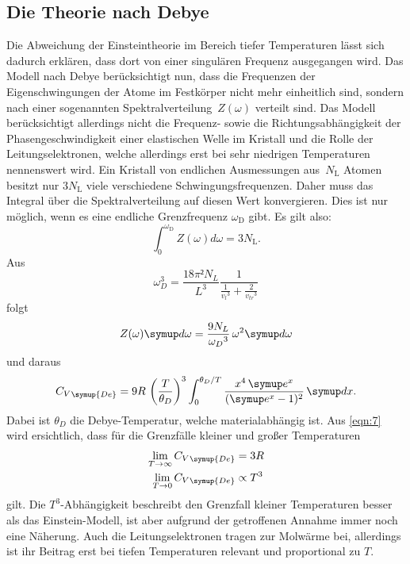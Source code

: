 \documentclass[
  bibliography=totoc,     %
  captions=tableheading,  %
  titlepage=firstiscover, %
]{scrartcl}
\begin{document}
\subsection{Die Theorie nach Debye}
Die Abweichung der Einsteintheorie im Bereich tiefer Temperaturen lässt sich
dadurch erklären, dass dort von einer singulären Frequenz ausgegangen wird.
Das Modell nach Debye berücksichtigt nun, dass die Frequenzen der
Eigenschwingungen der Atome im Festkörper nicht mehr einheitlich sind, sondern
nach einer sogenannten Spektralverteilung~$Z(\omega)$ verteilt sind.  Das Modell
berücksichtigt allerdings nicht die Frequenz- sowie die Richtungsabhängigkeit der
Phasengeschwindigkeit einer elastischen Welle im Kristall und die Rolle der
Leitungselektronen, welche allerdings erst bei sehr niedrigen Temperaturen
nennenswert wird. Ein Kristall von endlichen Ausmessungen aus~$N_{\mathrm{L}}$
Atomen besitzt nur $3N_{\mathrm{L}}$ viele verschiedene Schwingungsfrequenzen.
Daher muss das Integral über die
Spektralverteilung auf diesen Wert konvergieren. Dies ist nur möglich, wenn es
eine endliche Grenzfrequenz $\omega_{\mathrm{D}}$ gibt. Es gilt also:
%
\begin{equation}
  \int_0^{\omega_{\mathrm{D}}}Z(\omega)d\omega=3N_{\mathrm{L}}.
  \label{eq:konv}
\end{equation}
%
Aus
\begin{equation}
  \omega_D^3 = \frac{18 \pi² N_L}{L^3} \frac{1}{\frac{1}{{v_l}^3} + \frac{2}{{v_{tr}}^3}}
  \label{fürrune<3}
\end{equation}
folgt
\begin{equation*}
  Z(\omega) \symup d \omega = \frac{9N_L}{{\omega_D}^3} \, \omega^2 \symup d \omega
\end{equation*}
und daraus
\begin{equation}
  {C_V}_{\symup{De}} = 9 R \, \left(\frac{T}{\theta_D}\right)^3 \int_0^{\theta_D / T}
  \frac{x^4 \, \symup e^x}{(\symup e^x - 1)^2} \, \symup d x.
  \label{eqn:7}
\end{equation}
Dabei ist $\theta_D$ die Debye-Temperatur, welche materialabhängig ist. Aus \eqref{eqn:7}
wird ersichtlich, dass für die Grenzfälle kleiner und großer Temperaturen
\begin{align}
  \lim \limits_{T \to \infty}{{C_V}_{\symup{De}}} &= 3R \\
  \lim \limits_{T \to 0}{{C_V}_{\symup{De}}} &\propto T^3
\end{align}
gilt. Die $T^3$-Abhängigkeit beschreibt den Grenzfall kleiner Temperaturen besser
als das Einstein-Modell, ist aber aufgrund der getroffenen Annahme immer noch eine
Näherung. Auch die Leitungselektronen tragen zur Molwärme bei, allerdings ist ihr
Beitrag erst bei tiefen Temperaturen relevant und proportional zu $T$.
\end{document}
